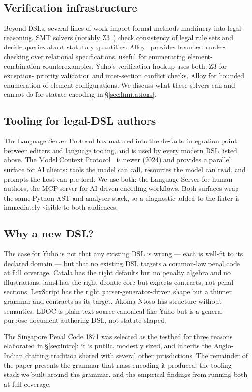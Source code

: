 \subsection{Verification infrastructure}
Beyond DSLs, several lines of work import formal-methods machinery into
legal reasoning. SMT solvers (notably Z3~\cite{demoura2008z3}) check
consistency of legal rule sets and decide queries about statutory
quantities. Alloy~\cite{jackson2002alloy} provides bounded model-checking
over relational specifications, useful for enumerating element-combination
counterexamples. Yuho's verification hookup uses both: Z3 for exception-
priority validation and inter-section conflict checks, Alloy for
bounded enumeration of element configurations. We discuss what these
solvers can and cannot do for statute encoding in
\S\ref{sec:limitations}.

\subsection{Tooling for legal-DSL authors}
The Language Server Protocol has matured into the de-facto integration
point between editors and language tooling, and is used by every modern
DSL listed above. The Model Context Protocol~\cite{mcp2024} is newer
(2024) and provides a parallel surface for AI clients: tools the model
can call, resources the model can read, and prompts the host can pre-load.
We use both: the Language Server for human authors, the MCP server for
AI-driven encoding workflows. Both surfaces wrap the same Python AST
and analyser stack, so a diagnostic added to the linter is immediately
visible to both audiences.

\subsection{Why a new DSL?}
The case for Yuho is not that any existing DSL is wrong --- each is
well-fit to its declared domain --- but that no existing DSL targets a
common-law penal code at full coverage. Catala has the right defaults
but no penalty algebra and no illustrations. lam4 has the right deontic
core but expects contracts, not penal sections. LexScript has the right
parser-generator-driven shape but a thinner grammar and contracts as
its target. Akoma Ntoso has structure without semantics. LDOC is
plain-text-source-canonical like Yuho but is a general-purpose
document-authoring DSL, not statute-shaped.

The Singapore Penal Code 1871 was selected as the testbed for three
reasons elaborated in \S\ref{sec:intro}: it is public, modestly sized,
and inherits the Anglo-Indian drafting tradition shared with several
other jurisdictions. The remainder of the paper presents the grammar
that mass-encoding it produced, the tooling stack we built around the
grammar, and the empirical findings from running both at full coverage.
